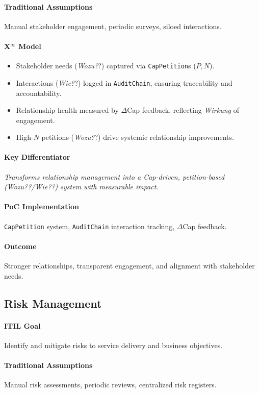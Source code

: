 \documentclass[12pt, a4paper]{scrartcl}
\newcommand{\Xinf}{X$^\infty$}                        %
\newcommand{\DeltaCap}{$\Delta$Cap}                    %
\newcommand{\Wirkung}{\textit{Wirkung}}                 %
\newcommand{\AuditChain}{\texttt{AuditChain}}
\newcommand{\CapPetition}{\texttt{CapPetition}}        %
\newcommand{\Wozu}{\textit{Wozu?}}                      %
\newcommand{\Wie}{\textit{Wie?}}                        %
\begin{document}
\paragraph{Traditional Assumptions} Manual stakeholder engagement, periodic surveys, siloed interactions.
\paragraph*{\Xinf{} Model}
\begin{itemize}
    \item Stakeholder needs (\Wozu?) captured via \CapPetition{}s ($P, N$).
    \item Interactions (\Wie?) logged in \AuditChain{}, ensuring traceability and accountability.
    \item Relationship health measured by \DeltaCap{} feedback, reflecting \Wirkung{} of engagement.
    \item High-$N$ petitions (\Wozu?) drive systemic relationship improvements.
\end{itemize}
\paragraph{Key Differentiator} \textit{Transforms relationship management into a Cap-driven, petition-based (\Wozu?/\Wie?) system with measurable impact.}
\paragraph{PoC Implementation} \CapPetition{} system, \AuditChain{} interaction tracking, \DeltaCap{} feedback.
\paragraph{Outcome} Stronger relationships, transparent engagement, and alignment with stakeholder needs.

\subsection{Risk Management} %
\paragraph{ITIL Goal} Identify and mitigate risks to service delivery and business objectives.
\paragraph{Traditional Assumptions} Manual risk assessments, periodic reviews, centralized risk registers.
\end{document}

